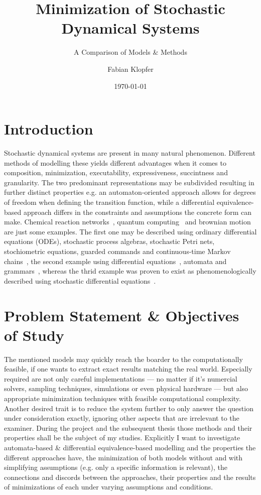 \documentclass[11pt, rgb]{scrartcl}
\date{\today}
\author{Fabian Klopfer}
\title{Minimization of Stochastic Dynamical Systems}
\subtitle{A Comparison of Models \& Methods}
\begin{document}
\restoregeometry


\section{Introduction} Stochastic dynamical systems are present in many natural phenomenon. 
Different methods of modelling these yields different advantages when it comes to composition, minimization, executability, expressiveness, succintness and granularity. 
The two predominant representations may be subdivided resulting in further distinct properties e.g. an automaton-oriented approach allows for degrees of freedom when defining the transition function, while a differential equivalence-based approach differs in the constraints and assumptions the concrete form can make.
 Chemical reaction networks~\autocite{mc_agg_crn}, quantum computing~\autocite{moore2000quantum} and brownian motion~\autocite{einstein1906theory} are just some examples.
 The first one may be described using ordinary differential equations (ODEs), stochastic process algebras, stochastic Petri nets, stochiometric equations, guarded commands and continuous-time Markov chains~\cite{wolf}, the second example using differential equations~\autocite{von2018mathematical}, automata and grammars~\autocite{moore2000quantum}, whereas the thrid example was proven to exist as phenomenologically described using stochastic differential equations~\autocite{einstein1906theory}.
 

\section{Problem Statement \& Objectives of Study}
The mentioned models may quickly reach the boarder to the computationally feasible, if one wants to extract exact results matching the real world. 
Especially required are not only careful implementations --- no matter if it's numercial solvers, sampling techniques, simulations or even physical hardware --- but also appropriate minimization techniques with feasible computational complexity. 
Another desired trait is to reduce the system further to only answer the question under consideration exactly, ignoring other aspects that are irrelevant to the examiner. 
During the project and the subsequent thesis those methods and their properties shall be the subject of my studies.
Explicitly I want to investigate automata-based \& differential equivalence-based modelling and the properties the different approaches have, the minimization of both models without and with simplifying assumptions (e.g. only a specific information is relevant), the connections and discords between the approaches, their properties and the results of minimizations of each under varying assumptions and conditions.
\end{document}
